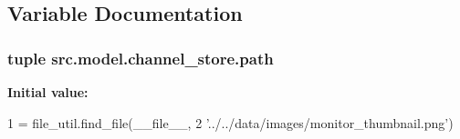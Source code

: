 \subsection{Variable Documentation}
\hypertarget{namespacesrc_1_1model_1_1channel__store_ad6a2d7a2daa05e0242577b1566dc3677}{}
\subsubsection[{path}]{\setlength{\rightskip}{0pt plus 5cm}tuple src.\+model.\+channel\+\_\+store.\+path}\label{namespacesrc_1_1model_1_1channel__store_ad6a2d7a2daa05e0242577b1566dc3677}
{\bfseries Initial value\+:}
\begin{DoxyCode}
1 = file\_util.find\_file(\_\_file\_\_,
2                                     \textcolor{stringliteral}{'../../data/images/monitor\_thumbnail.png'})
\end{DoxyCode}
